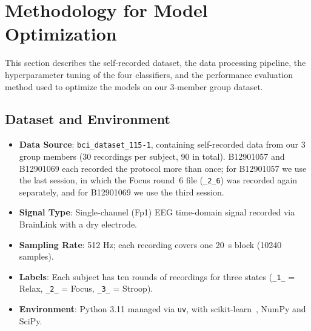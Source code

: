 \section{Methodology for Model Optimization}\label{sec:method}

This section describes the self-recorded dataset, the data processing pipeline, the hyperparameter tuning of the four classifiers, and the performance evaluation method used to optimize the models on our 3-member group dataset.

\subsection{Dataset and Environment}
\begin{itemize}[leftmargin=*]
    \item \textbf{Data Source}: \texttt{bci\_dataset\_115-1}, containing self-recorded data from our 3 group members (30 recordings per subject, 90 in total). B12901057 and B12901069 each recorded the protocol more than once; for B12901057 we use the last session, in which the Focus round~6 file (\texttt{\_2\_6}) was recorded again separately, and for B12901069 we use the third session. 
    \item \textbf{Signal Type}: Single-channel (Fp1) EEG time-domain signal recorded via BrainLink with a dry electrode.
    \item \textbf{Sampling Rate}: 512 Hz; each recording covers one 20~s block (10240 samples).
    \item \textbf{Labels}: Each subject has ten rounds of recordings for three states (\texttt{\_1\_} = Relax, \texttt{\_2\_} = Focus, \texttt{\_3\_} = Stroop).
    \item \textbf{Environment}: Python 3.11 managed via \texttt{uv}, with scikit-learn~\cite{pedregosa2011}, NumPy and SciPy.
\end{itemize}

